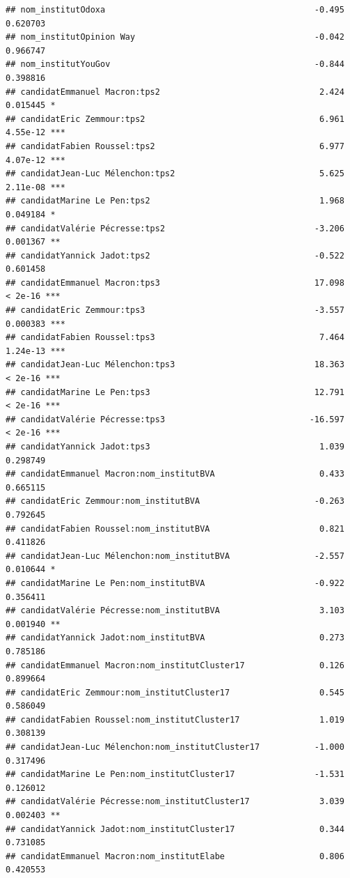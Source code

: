\documentclass[
]{book}
\begin{document}
\begin{verbatim}
## nom_institutOdoxa                                          -0.495 0.620703    
## nom_institutOpinion Way                                    -0.042 0.966747    
## nom_institutYouGov                                         -0.844 0.398816    
## candidatEmmanuel Macron:tps2                                2.424 0.015445 *  
## candidatEric Zemmour:tps2                                   6.961 4.55e-12 ***
## candidatFabien Roussel:tps2                                 6.977 4.07e-12 ***
## candidatJean-Luc Mélenchon:tps2                             5.625 2.11e-08 ***
## candidatMarine Le Pen:tps2                                  1.968 0.049184 *  
## candidatValérie Pécresse:tps2                              -3.206 0.001367 ** 
## candidatYannick Jadot:tps2                                 -0.522 0.601458    
## candidatEmmanuel Macron:tps3                               17.098  < 2e-16 ***
## candidatEric Zemmour:tps3                                  -3.557 0.000383 ***
## candidatFabien Roussel:tps3                                 7.464 1.24e-13 ***
## candidatJean-Luc Mélenchon:tps3                            18.363  < 2e-16 ***
## candidatMarine Le Pen:tps3                                 12.791  < 2e-16 ***
## candidatValérie Pécresse:tps3                             -16.597  < 2e-16 ***
## candidatYannick Jadot:tps3                                  1.039 0.298749    
## candidatEmmanuel Macron:nom_institutBVA                     0.433 0.665115    
## candidatEric Zemmour:nom_institutBVA                       -0.263 0.792645    
## candidatFabien Roussel:nom_institutBVA                      0.821 0.411826    
## candidatJean-Luc Mélenchon:nom_institutBVA                 -2.557 0.010644 *  
## candidatMarine Le Pen:nom_institutBVA                      -0.922 0.356411    
## candidatValérie Pécresse:nom_institutBVA                    3.103 0.001940 ** 
## candidatYannick Jadot:nom_institutBVA                       0.273 0.785186    
## candidatEmmanuel Macron:nom_institutCluster17               0.126 0.899664    
## candidatEric Zemmour:nom_institutCluster17                  0.545 0.586049    
## candidatFabien Roussel:nom_institutCluster17                1.019 0.308139    
## candidatJean-Luc Mélenchon:nom_institutCluster17           -1.000 0.317496    
## candidatMarine Le Pen:nom_institutCluster17                -1.531 0.126012    
## candidatValérie Pécresse:nom_institutCluster17              3.039 0.002403 ** 
## candidatYannick Jadot:nom_institutCluster17                 0.344 0.731085    
## candidatEmmanuel Macron:nom_institutElabe                   0.806 0.420553    

\end{verbatim}
\end{document}
